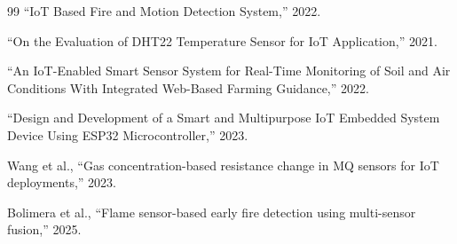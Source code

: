 \documentclass[12pt,a4paper]{article}
\begin{document}
\begin{thebibliography}{99}
		``IoT Based Fire and Motion Detection System,'' 2022.
		
		``On the Evaluation of DHT22 Temperature Sensor for IoT Application,'' 2021.
		
		``An IoT-Enabled Smart Sensor System for Real-Time Monitoring of Soil and Air Conditions With Integrated Web-Based Farming Guidance,'' 2022.
		
		``Design and Development of a Smart and Multipurpose IoT Embedded System Device Using ESP32 Microcontroller,'' 2023.
		
		Wang et al., ``Gas concentration-based resistance change in MQ sensors for IoT deployments,'' 2023.
		
		Bolimera et al., ``Flame sensor-based early fire detection using multi-sensor fusion,'' 2025.
		
	\end{thebibliography}
	
\end{document}
